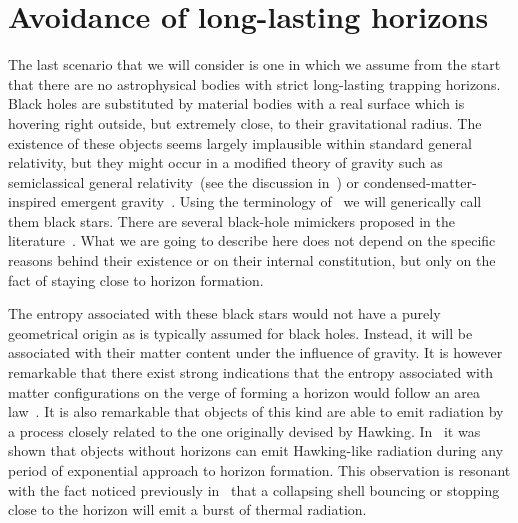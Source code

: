 \documentclass[12pt]{article}
\begin{document}
 
 
\section{Avoidance of long-lasting horizons}
\label{Sec:No-horizons}

The last scenario that we will consider is one in which  we assume from the start that
there are no astrophysical bodies with strict long-lasting trapping horizons.
Black holes are substituted by  material bodies with a real surface which is
hovering right outside, but extremely close, to their gravitational radius. The
existence of these objects seems largely implausible within standard general
relativity, but they might occur in a modified theory of gravity such as
semiclassical general relativity~(see the discussion in~\cite{barcelo-fate}) or condensed-matter-inspired emergent gravity~\cite{Barcelo:2010vc}. 
Using the terminology of~\cite{barcelo-fate} we will generically call them black stars.
There are several black-hole mimickers proposed in the literature~\cite{barcelo-fate,mimickers1,mimickers2}. What we are going to describe here does not depend on the specific reasons behind their existence or on their internal constitution, but only on the fact of staying close to horizon formation.


The entropy associated with these black stars would not have a purely
geometrical origin as is typically assumed for black holes. Instead, it will be
associated with their matter content under the influence of gravity. It is
however remarkable that there exist strong indications that the entropy
associated with matter configurations on the verge of forming a horizon would 
follow  an area law~\cite{sorkin,Pretorius:1997wr,abreu,abreu-barcelo,lemos}. It is also remarkable that
objects of this kind are able to emit radiation by a process closely related to
the one originally devised by Hawking. In~\cite{barcelo-rad-no-hor} it was shown
that objects without horizons can emit Hawking-like radiation during any period
of exponential approach to horizon formation. This observation is resonant with
the fact noticed previously  in~\cite{thooft} that a collapsing shell bouncing
or stopping close to the horizon  will emit a burst of thermal radiation.  
\end{document}

